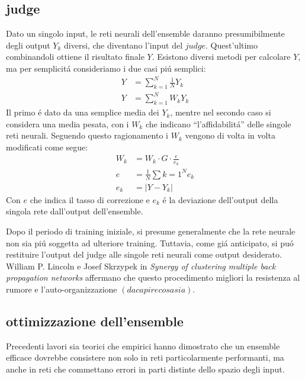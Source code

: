 \documentclass[a4paper,12pt]{report}
\begin{document}
 \subsection{judge}
 
 Dato un singolo input, le reti neurali dell'ensemble daranno presumibilmente degli output $Y_k$ diversi, che diventano l'input del $judge$. Quest'ultimo combinandoli ottiene il risultato finale $Y$. 
 Esistono diversi metodi per calcolare $Y$, ma per semplicit\'a consideriamo i due casi pi\'u semplici:
 \begin{align}
  Y &= \sum_{k=1}^N \frac{1}{N} Y_k \\
  Y &= \sum_{k=1}^N W_k Y_k
 \end{align}
 Il primo \'e dato da una semplice media dei $Y_k$, mentre nel secondo caso si considera una media pesata, con i $W_k$ che indicano ``l'affidabilit\'a'' delle singole reti neurali. 
 Seguendo questo ragionamento i $W_k$ vengono di volta in volta modificati come segue:
 \begin{align}
  W_k &= W_k \cdot G \cdot \frac{e}{e_k} \label{JudgeWeights} \\
  e &= \frac{1}{N} \sum{k=1}^N e_k \\
  e_k &= \left | Y - Y_k \right |
 \end{align}
 Con $e$ che indica il tasso di correzione e $e_k$ \'e la deviazione dell'output della singola rete dall'output dell'ensemble.
 
 Dopo il periodo di training iniziale, si presume generalmente che la rete neurale non sia pi\'u soggetta ad ulteriore training. 
 Tuttavia, come gi\'a anticipato, si pu\'o restituire l'output del judge alle singole reti neurali come output desiderato. 
 William P. Lincoln e Josef Skrzypek in \textit{Synergy of clustering multiple back propagation networks} affermano che questo procedimento migliori la resistenza al rumore e l'auto-organizzazione $(da capire cosa sia)$.
  
 \subsection{ottimizzazione dell'ensemble}
  Precedenti lavori sia teorici \cite{hansen1990neural} \cite{krogh1995neural} che empirici \cite{hashem1994optimal} \cite{maclin1995combining} hanno dimostrato che un ensemble efficace dovrebbe consistere non solo in reti particolarmente performanti, ma anche in reti che commettano errori in parti distinte dello spazio degli input. 
 
\end{document}
